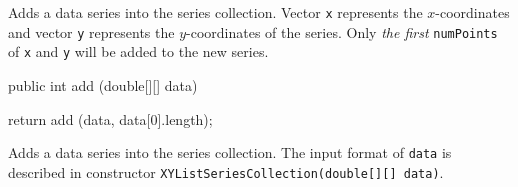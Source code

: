 \begin{tabb}
   Adds a data series into the series collection. Vector \texttt{x} represents
   the $x$-coordinates and vector \texttt{y} represents the $y$-coordinates of
   the series. Only \emph{the first} \texttt{numPoints} of \texttt{x}
   and \texttt{y} will be added to the new series.
\end{tabb}
\begin{htmlonly}
\end{htmlonly}
\begin{code}

   public int add (double[][] data) \begin{hide} {
      return add (data, data[0].length);
   }\end{hide}
\end{code}
\begin{tabb}
   Adds a data series into the series collection. The input format of
 \texttt{data} is described in constructor
\texttt{XYListSeriesCollection(double[][] data)}.
\end{tabb}
\begin{htmlonly}
\end{htmlonly}
